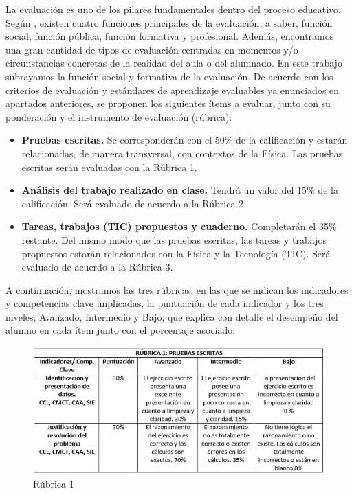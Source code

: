 \documentclass[../main.tex]{memoir}
\begin{document}
La evaluación es uno de los pilares fundamentales dentro del proceso educativo. Según \cite{rico2013}, existen cuatro funciones principales de la evaluación, a saber, función social, función pública, función formativa y profesional. Además, encontramos una gran cantidad de tipos de evaluación centradas en momentos y/o circunstancias concretas de la realidad del aula o del alumnado. En este trabajo subrayamos la función social y formativa de la evaluación. De acuerdo con los criterios de evaluación y estándares de aprendizaje evaluables ya enunciados en apartados anteriores, se proponen los siguientes ítems a evaluar, junto con su ponderación y el instrumento de evaluación (rúbrica):

\begin{itemize}
	\item \textbf{Pruebas escritas.} Se corresponderán con el 50\% de la calificación y estarán relacionadas, de manera transversal, con contextos de la Física. Las pruebas escritas serán evaluadas con la Rúbrica 1.
	\item \textbf{Análisis del trabajo realizado en clase.} Tendrá un valor del 15\% de la calificación. Será evaluado de acuerdo a la Rúbrica 2.
	\item \textbf{Tareas, trabajos (TIC) propuestos y cuaderno.} Completarán el 35\% restante. Del mismo modo que las pruebas escritas, las tareas y trabajos propuestos estarán relacionados con la Física y la Tecnología (TIC).  Será evaluado de acuerdo a la Rúbrica 3.
\end{itemize}

A continuación, mostramos las tres rúbricas, en las que se indican los indicadores y competencias clave implicadas, la puntuación de cada indicador y los tres niveles, Avanzado, Intermedio y Bajo, que explica con detalle el desempeño del alumno en cada ítem junto con el porcentaje asociado.

\begin{figure}[H]
	\centering
	\includegraphics[scale=0.8]{images/rub1.jpeg}
	\caption{Rúbrica 1}
	\label{rubrica1}
\end{figure}
\end{document}
